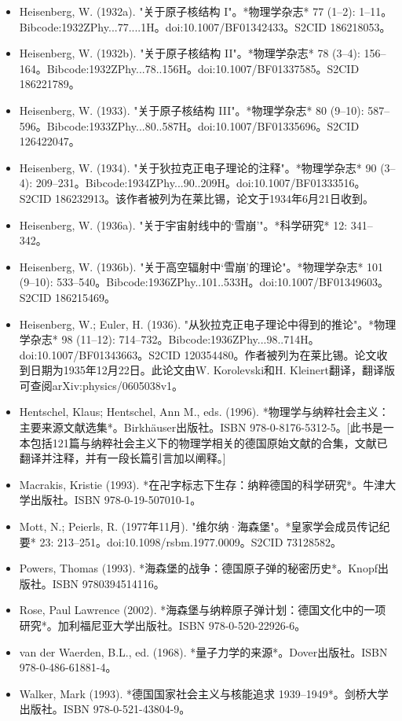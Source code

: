 \begin{itemize}
\item Heisenberg, W. (1932a). "关于原子核结构 I"。*物理学杂志* 77 (1–2): 1–11。Bibcode:1932ZPhy...77....1H。doi:10.1007/BF01342433。S2CID 186218053。  
\item Heisenberg, W. (1932b). "关于原子核结构 II"。*物理学杂志* 78 (3–4): 156–164。Bibcode:1932ZPhy...78..156H。doi:10.1007/BF01337585。S2CID 186221789。  
\item Heisenberg, W. (1933). "关于原子核结构 III"。*物理学杂志* 80 (9–10): 587–596。Bibcode:1933ZPhy...80..587H。doi:10.1007/BF01335696。S2CID 126422047。  
\item Heisenberg, W. (1934). "关于狄拉克正电子理论的注释"。*物理学杂志* 90 (3–4): 209–231。Bibcode:1934ZPhy...90..209H。doi:10.1007/BF01333516。S2CID 186232913。该作者被列为在莱比锡，论文于1934年6月21日收到。
\item Heisenberg, W. (1936a). "关于宇宙射线中的‘雪崩’"。*科学研究* 12: 341–342。  
\item Heisenberg, W. (1936b). "关于高空辐射中‘雪崩’的理论"。*物理学杂志* 101 (9–10): 533–540。Bibcode:1936ZPhy..101..533H。doi:10.1007/BF01349603。S2CID 186215469。  
\item Heisenberg, W.; Euler, H. (1936). "从狄拉克正电子理论中得到的推论"。*物理学杂志* 98 (11–12): 714–732。Bibcode:1936ZPhy...98..714H。doi:10.1007/BF01343663。S2CID 120354480。作者被列为在莱比锡。论文收到日期为1935年12月22日。此论文由W. Korolevski和H. Kleinert翻译，翻译版可查阅arXiv:physics/0605038v1。  
\item Hentschel, Klaus; Hentschel, Ann M., eds. (1996). *物理学与纳粹社会主义：主要来源文献选集*。Birkhäuser出版社。ISBN 978-0-8176-5312-5。[此书是一本包括121篇与纳粹社会主义下的物理学相关的德国原始文献的合集，文献已翻译并注释，并有一段长篇引言加以阐释。]  
\item Macrakis, Kristie (1993). *在卍字标志下生存：纳粹德国的科学研究*。牛津大学出版社。ISBN 978-0-19-507010-1。  
\item Mott, N.; Peierls, R. (1977年11月). "维尔纳·海森堡"。*皇家学会成员传记纪要* 23: 213–251。doi:10.1098/rsbm.1977.0009。S2CID 73128582。  
\item Powers, Thomas (1993). *海森堡的战争：德国原子弹的秘密历史*。Knopf出版社。ISBN 9780394514116。  
\item Rose, Paul Lawrence (2002). *海森堡与纳粹原子弹计划：德国文化中的一项研究*。加利福尼亚大学出版社。ISBN 978-0-520-22926-6。  
\item van der Waerden, B.L., ed. (1968). *量子力学的来源*。Dover出版社。ISBN 978-0-486-61881-4。  
\item Walker, Mark (1993). *德国国家社会主义与核能追求 1939–1949*。剑桥大学出版社。ISBN 978-0-521-43804-9。
\end{itemize}
